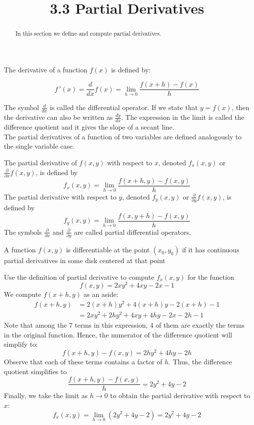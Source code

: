 \documentclass[handout]{ximera}
\title{3.3 Partial Derivatives}
\begin{document}
\begin{abstract}
In this section we define and compute partial derivatives.
\end{abstract}

\maketitle

The derivative of a function $f(x)$ is defined by:

\[
f\,'(x) =  \frac{d}{dx} f(x) = \lim_{h \to 0} \frac{f(x+h) -f(x)}{h}
\]

The symbol $\frac{d}{dx}$ is called the differential operator. 
If we state that $y = f(x)$, then the derivative can also be written as $\frac{dy}{dx}$.
The expression in the limit is called the difference quotient and it gives 
the slope of a secant line.\\
The partial derivatives of a function of two variables are defined 
analogously to the single variable case.

\begin{definition}
The partial derivative of $f(x,y)$ with respect to $x$, denoted $f_x(x,y)$ 
or $\frac{\partial}{\partial x} f(x,y)$, is defined by
\[
f_x(x,y)= \lim_{h \to 0} \frac{f(x+h, y) -f(x, y)}{h}
\]
The partial derivative with respect to $y$, denoted $f_y(x,y)$ 
or $\frac{\partial}{\partial y} f(x,y)$, is defined by
\[
f_y(x,y) = \lim_{h \to 0} \frac{f(x, y+h) -f(x, y)}{h}
\]
The symbols $\frac{\partial}{\partial x}$ and $\frac{\partial}{\partial y}$ are called 
partial differential operators.

\end{definition}

\begin{definition}[Differentiability]
A function $f(x,y)$ is differentiable at the point $(x_0, y_0)$ if it 
has continuous partial derivatives in some disk centered at that point
\end{definition}

\begin{example}[Example 1]
Use the definition of partial derivative to compute $f_x(x,y)$ for the function
\[
f(x,y) = 2xy^2 + 4xy - 2x -1
\]
We compute $f(x+h, y)$ as an aside:
\begin{align*}
f(x+h, y) &= 2(x+h)y^2 + 4(x+h)y - 2(x+h)  -1\\
          &= 2xy^2 + 2hy^2 + 4xy + 4hy - 2x - 2h - 1
\end{align*}
Note that among the 7 terms in this expression, 4 of them are exactly the 
terms in the original function.
Hence, the numerator of the difference quotient will simplify to:
\[
f(x+h, y) - f(x,y) =  2hy^2 + 4hy - 2h
\]
Observe that each of these terms contains a factor of $h$. 
Thus, the difference quotient simplifies to
\[
\frac{f(x+h, y) -f(x, y)}{h} = 2y^2 + 4y - 2
\]
Finally, we take the limit as $h \to 0$ to obtain the partial derivative 
with respect to $x$:
\[
f_x(x,y) = \lim_{h \to 0} \left(2y^2 + 4y - 2\right) = 2y^2 + 4y - 2
\]

\end{example}
\end{document}
